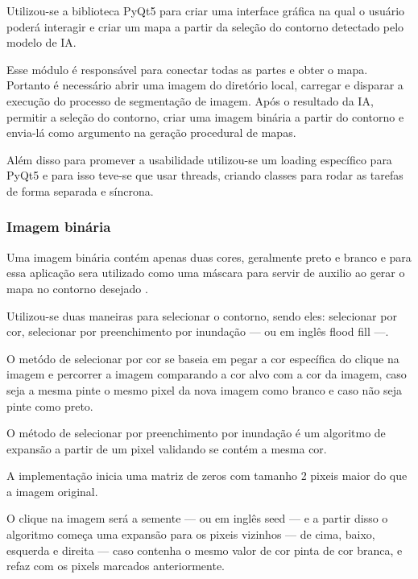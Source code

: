 Utilizou-se a biblioteca PyQt5 para criar uma interface gráfica na qual o usuário poderá interagir e criar um mapa a partir da seleção do contorno detectado pelo modelo de IA.

Esse módulo é responsável para conectar todas as partes e obter o mapa. Portanto é necessário abrir uma imagem do diretório local, carregar e disparar a execução do processo de segmentação de imagem. Após o resultado da IA, permitir a seleção do contorno,  criar uma imagem binária a partir do contorno e envia-lá como argumento na geração procedural de mapas.

Além disso para promever a usabilidade utilizou-se um loading específico para PyQt5 e para isso teve-se que usar threads, criando classes para rodar as tarefas de forma separada e síncrona.

\subsubsection{Imagem binária}

Uma imagem  binária contém  apenas duas cores, geralmente preto e  branco e para essa aplicação sera utilizado como uma máscara para servir de auxilio ao  gerar o  mapa no contorno desejado \cite{Aznag2020}.

Utilizou-se duas maneiras para selecionar o contorno, sendo eles: selecionar por cor, selecionar por preenchimento por inundação — ou  em inglês  flood fill —.


O metódo de selecionar por cor se baseia em pegar a cor específica do clique na imagem e percorrer a imagem comparando a cor alvo com a cor da imagem, caso seja a mesma pinte o mesmo pixel da nova imagem como branco e caso não seja pinte como preto.


O método de  selecionar por preenchimento por inundação é um algoritmo de expansão a partir de um pixel validando se contém a mesma cor.

A implementação inicia uma matriz de zeros com tamanho 2 pixeis maior do que a imagem original.

O clique na  imagem será a semente — ou em inglês  seed — e a partir disso o algoritmo começa uma expansão para os pixeis vizinhos — de cima, baixo, esquerda e direita — caso contenha o mesmo valor de cor pinta de cor branca, e refaz com os pixels marcados  anteriormente.

